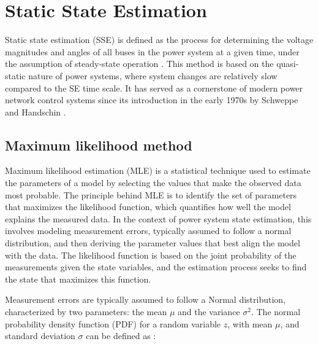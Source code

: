 \section{Static State Estimation}\label{sec:ch1/sec4}

Static state estimation (SSE) is defined as the process for determining the voltage magnitudes and angles of all buses in the power system at a given time, under the assumption of steady-state operation \autocite{Phadke12008springer}. This method is based on the quasi-static nature of power systems, where system changes are relatively slow compared to the SE time scale. It has served as a cornerstone of modern power network control systems since its introduction in the early 1970s by Schweppe and Handschin \autocite{4074022}. 


\subsection{Maximum likelihood method}\label{subsec:ch1/sec4/sub1}

Maximum likelihood estimation (MLE) is a statistical technique used to estimate the parameters of a model by selecting the values that make the observed data most probable. The principle behind MLE is to identify the set of parameters that maximizes the likelihood function, which quantifies how well the model explains the measured data. In the context of power system state estimation, this involves modeling measurement errors, typically assumed to follow a normal distribution, and then deriving the parameter values that best align the model with the data. The likelihood function is based on the joint probability of the measurements given the state variables, and the estimation process seeks to find the state that maximizes this function. 


Measurement errors are typically assumed to follow a Normal distribution, characterized by two parameters: the mean $\mu$ and the variance $\sigma^2$. The normal probability density function (PDF) for a random variable $z$, with mean $\mu$, and standard deviation $\sigma$ can be defined as \autocite{Abur2004}:


